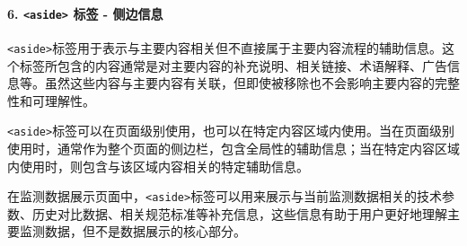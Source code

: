 \paragraph{\texorpdfstring{6. \texttt{\textless{}aside\textgreater{}} 标签 - 侧边信息}{6. \textless aside\textgreater{} 标签 - 侧边信息}}\label{aside-ux6807ux7b7e---ux4fa7ux8fb9ux4fe1ux606f}

\texttt{\textless{}aside\textgreater{}}标签用于表示与主要内容相关但不直接属于主要内容流程的辅助信息。这个标签所包含的内容通常是对主要内容的补充说明、相关链接、术语解释、广告信息等。虽然这些内容与主要内容有关联，但即使被移除也不会影响主要内容的完整性和可理解性。

\texttt{\textless{}aside\textgreater{}}标签可以在页面级别使用，也可以在特定内容区域内使用。当在页面级别使用时，通常作为整个页面的侧边栏，包含全局性的辅助信息；当在特定内容区域内使用时，则包含与该区域内容相关的特定辅助信息。

在监测数据展示页面中，\texttt{\textless{}aside\textgreater{}}标签可以用来展示与当前监测数据相关的技术参数、历史对比数据、相关规范标准等补充信息，这些信息有助于用户更好地理解主要监测数据，但不是数据展示的核心部分。

